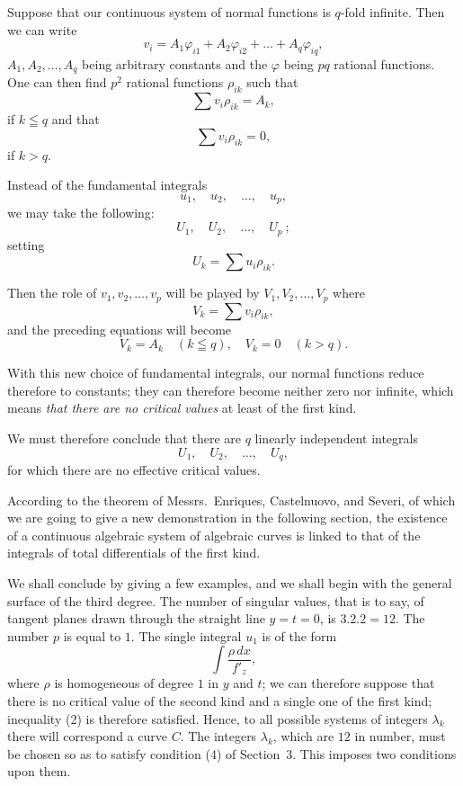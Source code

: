 \documentclass{article}
\begin{document}
Suppose that our continuous system of normal functions is $q$-fold infinite. Then we can write
\[
v_{i} = A_{1} \varphi_{i1} + A_{2} \varphi_{i2} + \ldots + A_{q} \varphi_{iq},
\]
$A_{1}, A_{2}, \ldots, A_{q}$ being arbitrary constants and the $\varphi$ being $pq$ rational
functions. One can then find $p^{2}$ rational functions $\rho_{ik}$ such that
\[
\sum v_{i} \rho_{ik} = A_{k},
\]
if $k \leqq q$ and that
\[
\sum v_{i} \rho_{ik} = 0,
\]
if $k > q$.

Instead of the fundamental integrals
\[
u_{1}, \quad u_{2}, \quad \ldots, \quad u_{p},
\]
we may take the following:
\[
U_{1}, \quad U_{2}, \quad \ldots, \quad U_{p}~;
\]
setting
\[
U_{k} = \sum u_{i} \rho_{ik}.
\]

Then the role of $v_{1}, v_{2}, \ldots, v_{p}$ will be played by $V_{1}, V_{2}, \ldots, V_{p}$ where
\[
V_{k} = \sum v_{i} \rho_{ik},
\]
and the preceding equations will become
\[
V_{k} = A_{k} \quad (k \leqq q), \quad V_{k} = 0 \quad (k > q).
\]

With this new choice of fundamental integrals, our normal functions reduce therefore to constants; they can therefore become neither zero nor infinite, which means \emph{that there are no critical values} at least of the first kind.

We must therefore conclude that there are $q$ linearly independent integrals
\[
U_{1}, \quad U_{2}, \quad \ldots, \quad U_{q},
\]
for which there are no effective critical values.

According to the theorem of Messrs.~Enriques, Castelnuovo, and Severi, of which we are going to give a new demonstration in the following section, the existence of a continuous algebraic system of algebraic curves
is linked to that of the integrals of total differentials of the first kind.

We shall conclude by giving a few examples, and we shall begin with the general surface of the third degree. The number of singular values, that is to say, of tangent planes drawn through the straight line $y = t = 0$, is $3.2.2 = 12$. The number $p$ is equal to $1$. The single integral $u_{1}$ is of the form
\[
\int \frac{\rho \,dx}{f'_{z}},
\]
where $\rho$ is homogeneous of degree $1$ in $y$ and $t$; we can therefore suppose that there is no critical value of the second kind and a single one of the first kind; inequality (2) is therefore satisfied. Hence, to all possible systems of integers $\lambda_{k}$ there will correspond a curve $C$. The integers $\lambda_{k}$, which are $12$ in number, must be chosen so as to satisfy condition (4) of Section~3. This imposes two conditions upon them.
\end{document}
